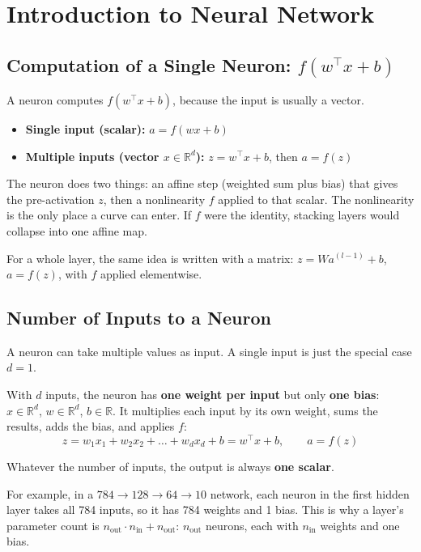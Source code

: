 \section{Introduction to Neural Network}

\subsection*{Computation of a Single Neuron: $f(w^\top x + b)$}

A neuron computes $f(w^\top x + b)$, because the input is usually a vector.

\begin{itemize}
    \item \textbf{Single input (scalar):} $a = f(wx + b)$
    \item \textbf{Multiple inputs (vector $x \in \mathbb{R}^d$):} $z = w^\top x + b$, then $a = f(z)$
\end{itemize}

The neuron does two things: an affine step (weighted sum plus bias) that gives the pre-activation $z$, then a nonlinearity $f$ applied to that scalar. The nonlinearity is the only place a curve can enter. If $f$ were the identity, stacking layers would collapse into one affine map.

For a whole layer, the same idea is written with a matrix: $z = W a^{(l-1)} + b$, $a = f(z)$, with $f$ applied elementwise.

\subsection*{Number of Inputs to a Neuron}

A neuron can take multiple values as input. A single input is just the special case $d = 1$.

With $d$ inputs, the neuron has \textbf{one weight per input} but only \textbf{one bias}: $x \in \mathbb{R}^d$, $w \in \mathbb{R}^d$, $b \in \mathbb{R}$. It multiplies each input by its own weight, sums the results, adds the bias, and applies $f$:
\[
z = w_1 x_1 + w_2 x_2 + \dots + w_d x_d + b = w^\top x + b, \qquad a = f(z)
\]

Whatever the number of inputs, the output is always \textbf{one scalar}.

For example, in a $784 \to 128 \to 64 \to 10$ network, each neuron in the first hidden layer takes all 784 inputs, so it has 784 weights and 1 bias. This is why a layer's parameter count is $n_{\text{out}} \cdot n_{\text{in}} + n_{\text{out}}$: $n_{\text{out}}$ neurons, each with $n_{\text{in}}$ weights and one bias.

